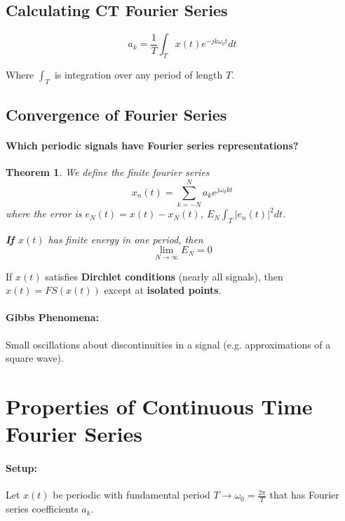 \documentclass[a4paper,12pt]{report}
\newtheorem{theorem}{Theorem}
\begin{document}
\subsection{Calculating CT Fourier Series}

\begin{equation}
a_k = \frac{1}{T} \int_{T} x(t) e^{-jk\omega_0 t} dt
\end{equation}

Where $\int_{T}$ is integration over any period of length $T$.



\subsection{Convergence of Fourier Series}

\paragraph{Which periodic signals have Fourier series representations? } 

\begin{theorem}
We define the finite fourier series 
\begin{equation}
x_n(t) = \sum_{k=-N}^{N} a_k e^{j\omega_0 kt}
\end{equation}
where the error is $e_N(t) = x(t) - x_N(t)$, $E_N \int_{T}^{} |e_n(t)|^2 dt$. 

\textbf{If $x(t)$} has finite energy in one period, then 
\begin{equation}
\lim_{N\to \infty} E_N = 0
\end{equation}

\end{theorem}

If $x(t)$ satisfies \textbf{Dirchlet conditions} (nearly all signals), then $x(t) = FS(x(t))$ except at \textbf{isolated points}.

\paragraph{Gibbs Phenomena: } Small oscillations about discontinuities in a signal (e.g. approximations of a square wave).

\section{Properties of Continuous Time Fourier Series}

\paragraph{Setup: } Let $x(t)$ be periodic with fundamental period $T\to \omega_0 = \frac{2\pi}{T}$ that has Fourier series coefficients $a_k$.
\end{document}
